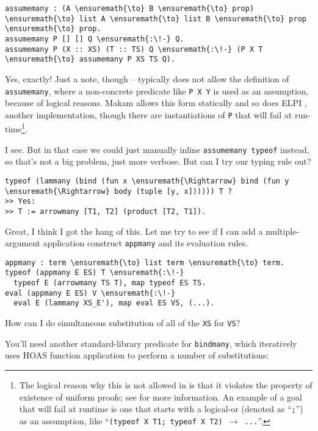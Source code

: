 \begin{verbatim}
assumemany : (A \ensuremath{\to} B \ensuremath{\to} prop) \ensuremath{\to} list A \ensuremath{\to} list B \ensuremath{\to} prop \ensuremath{\to} prop.
assumemany P [] [] Q \ensuremath{:\!-} Q.
assumemany P (X :: XS) (T :: TS) Q \ensuremath{:\!-} (P X T \ensuremath{\to} assumemany P XS TS Q).
\end{verbatim}

\heroADVISOR{} Yes, exactly! Just a note, though -- \lamprolog typically does
not allow the definition of \texttt{assumemany}, where a non-concrete
predicate like \texttt{P\ X\ Y} is used as an assumption, because of
logical reasons. Makam allows this form statically and so does ELPI
\citep{elpi-main-reference}, another \lamprolog implementation, though
there are instantiations of \texttt{P} that will fail at
run-time\footnote{The logical reason why this is not allowed in \lamprolog is that it violates the property of existence of uniform proofs; see \citet{assumemany-issue} for more information. An example of a goal that will fail at runtime is one that starts with a logical-or (denoted as ``\texttt{;}'') as an assumption, like ``\texttt{(typeof X T1; typeof X T2) \ensuremath{\to} ...}''.}.

\heroSTUDENT{} I see. But in that case we could just manually inline
\texttt{assumemany\ typeof} instead, so that's not a big problem, just
more verbose. But can I try our typing rule out?

\begin{verbatim}
typeof (lammany (bind (fun x \ensuremath{\Rightarrow} bind (fun y \ensuremath{\Rightarrow} body (tuple [y, x]))))) T ?
>> Yes:
>> T := arrowmany [T1, T2] (product [T2, T1]).
\end{verbatim}

\noindent
Great, I think I got the hang of this. Let me try to see if I can add a
multiple-argument application construct \texttt{appmany} and its
evaluation rules.

\begin{verbatim}
appmany : term \ensuremath{\to} list term \ensuremath{\to} term.
typeof (appmany E ES) T \ensuremath{:\!-}
  typeof E (arrowmany TS T), map typeof ES TS.
eval (appmany E ES) V \ensuremath{:\!-}
  eval E (lammany XS_E'), map eval ES VS, (...).
\end{verbatim}

\noindent
How can I do simultaneous substitution of all of the \texttt{XS} for
\texttt{VS}?

\heroADVISOR{} You'll need another standard-library predicate for
\texttt{bindmany}, which iteratively uses HOAS function application to
perform a number of substitutions:

